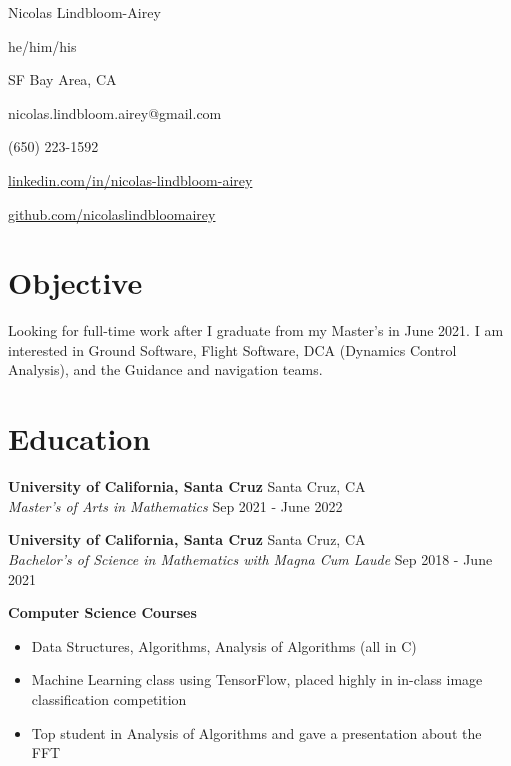 \documentclass[10pt,letterpaper]{article}
\begin{document}
\begin{minipage}[t]{0.6\textwidth}
{\Huge Nicolas Lindbloom-Airey}

he/him/his
\end{minipage}
\begin{minipage}[t]{0.4\textwidth}
SF Bay Area, CA 

 nicolas.lindbloom.airey@gmail.com

 (650) 223-1592 

 \href{https://www.linkedin.com/in/nicolas-lindbloom-airey/}{linkedin.com/in/nicolas-lindbloom-airey} 

 \href{https://github.com/nicolaslindbloomairey}{github.com/nicolaslindbloomairey} 

\end{minipage}


\section*{Objective} \hrulefill 

Looking for full-time work after I graduate from my Master's in June 2021. I am interested in Ground Software, Flight Software, DCA (Dynamics Control Analysis), and the Guidance and navigation teams.

\section*{Education} \hrulefill 

\textbf{University of California, Santa Cruz} \hfill  Santa Cruz, CA\\
\textit{Master's of Arts in Mathematics} \hfill  Sep 2021 - June 2022

\textbf{University of California, Santa Cruz} \hfill  Santa Cruz, CA\\
\textit{Bachelor's of Science in Mathematics with Magna Cum Laude} \hfill  Sep 2018 - June 2021

\textbf{Computer Science Courses}
\begin{itemize}
    \item Data Structures, Algorithms, Analysis of Algorithms (all in C)
    \item Machine Learning class using TensorFlow, placed highly in in-class image classification competition
    \item Top student in Analysis of Algorithms and gave a presentation about the FFT
\end{itemize}
\end{document}
